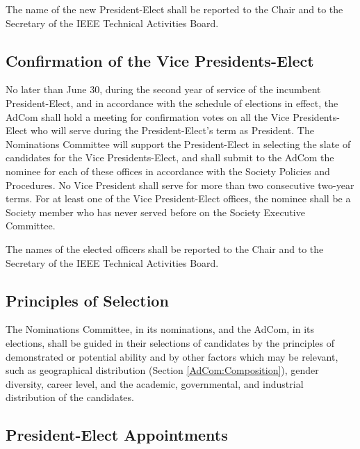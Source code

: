 \documentclass[10pt]{article}
\newcommand{\secref}[1]{Section \ref{#1}}
\begin{document}
The name of the new President-Elect shall be reported to the Chair and to the Secretary of the IEEE Technical Activities Board.

\subsection{ Confirmation of the Vice Presidents-Elect}

No later than June 30, during the second year of service of the incumbent President-Elect, and in accordance with the schedule of elections in effect, the AdCom shall hold a meeting for confirmation votes on all the Vice Presidents-Elect who will serve during the President-Elect's term as President. The Nominations Committee will support the President-Elect in selecting the slate of candidates for the Vice Presidents-Elect, and shall submit to the AdCom the nominee for each of these offices in accordance with the Society Policies and Procedures. No Vice President shall serve for more than two consecutive two-year terms. For at least one of the Vice President-Elect offices, the nominee shall be a Society member who has never served before on the Society Executive Committee. 

The names of the elected officers shall be reported to the Chair and to the Secretary of the IEEE Technical Activities Board.

\subsection{Principles of Selection}

The Nominations Committee, in its nominations, and the AdCom, in its elections, shall be guided in their selections of candidates by the principles of demonstrated or potential ability and by other factors which may be relevant, such as geographical distribution (\secref{AdCom:Composition}), gender diversity, career level, and the academic, governmental, and industrial distribution of the candidates.  


\subsection{President-Elect Appointments}
\end{document}
